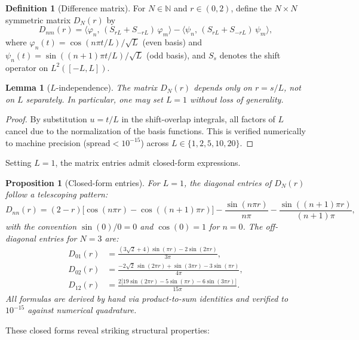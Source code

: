 \documentclass[12pt,a4paper]{article}
\newtheorem{lemma}[theorem]{Lemma}
\newtheorem{proposition}[theorem]{Proposition}
\theoremstyle{definition}
\newtheorem{definition}[theorem]{Definition}
\theoremstyle{remark}
\begin{document}
\begin{definition}[Difference matrix]
\label{def:D-matrix}
For $N \in \mathbb{N}$ and $r \in (0,2)$, define the $N \times N$ symmetric matrix $D_N(r)$ by
\[
  D_{nm}(r) = \langle \varphi_n,\, (S_{rL} + S_{-rL})\,\varphi_m \rangle
            - \langle \psi_n,\, (S_{rL} + S_{-rL})\,\psi_m \rangle,
\]
where $\varphi_n(t) = \cos(n\pi t/L)/\sqrt{L}$ (even basis) and $\psi_n(t) = \sin((n+1)\pi t/L)/\sqrt{L}$ (odd basis), and $S_s$ denotes the shift operator on $L^2([-L,L])$.
\end{definition}

\begin{lemma}[$L$-independence]
\label{lem:L-indep}
The matrix $D_N(r)$ depends only on $r = s/L$, not on $L$ separately. In particular, one may set $L = 1$ without loss of generality.
\end{lemma}

\begin{proof}
By substitution $u = t/L$ in the shift-overlap integrals, all factors of $L$ cancel due to the normalization of the basis functions. This is verified numerically to machine precision ($\text{spread} < 10^{-15}$) across $L \in \{1, 2, 5, 10, 20\}$.
\end{proof}

Setting $L=1$, the matrix entries admit closed-form expressions.

\begin{proposition}[Closed-form entries]
\label{prop:closed-form}
For $L = 1$, the diagonal entries of $D_N(r)$ follow a telescoping pattern:
\[
  D_{nn}(r) = (2-r)\bigl[\cos(n\pi r) - \cos((n{+}1)\pi r)\bigr]
  - \frac{\sin(n\pi r)}{n\pi} - \frac{\sin((n{+}1)\pi r)}{(n{+}1)\pi},
\]
with the convention $\sin(0)/0 = 0$ and $\cos(0) = 1$ for $n = 0$. The off-diagonal entries for $N = 3$ are:
\begin{align*}
  D_{01}(r) &= \frac{(3\sqrt{2}+4)\sin(\pi r) - 2\sin(2\pi r)}{3\pi}, \\
  D_{02}(r) &= \frac{-2\sqrt{2}\,\sin(2\pi r) + \sin(3\pi r) - 3\sin(\pi r)}{4\pi}, \\
  D_{12}(r) &= \frac{2\bigl[19\sin(2\pi r) - 5\sin(\pi r) - 6\sin(3\pi r)\bigr]}{15\pi}.
\end{align*}
All formulas are derived by hand via product-to-sum identities and verified to $10^{-15}$ against numerical quadrature.
\end{proposition}

These closed forms reveal striking structural properties:
\end{document}
